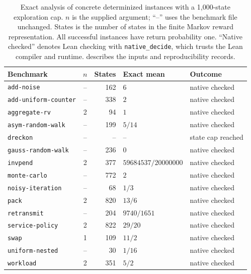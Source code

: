 \begin{table}[htbp]
    \centering
    \footnotesize
    \setlength{\tabcolsep}{3pt}
    \begin{tabular}{@{}l c r l l@{}}
        \toprule
        Benchmark & $n$ & States & Exact mean & Outcome \\
        \midrule
        \texttt{add-noise} & -- & 162 & $6$ & native checked \\
        \texttt{add-uniform-counter} & -- & 338 & $2$ & native checked \\
        \texttt{aggregate-rv} & 2 & 94 & $1$ & native checked \\
        \texttt{asym-random-walk} & -- & 199 & $5/14$ & native checked \\
        \texttt{dreckon} & -- & -- & -- & state cap reached \\
        \texttt{gauss-random-walk} & -- & 236 & $0$ & native checked \\
        \texttt{invpend} & 2 & 377 & $59684537/20000000$ & native checked \\
        \texttt{monte-carlo} & -- & 772 & $2$ & native checked \\
        \texttt{noisy-iteration} & -- & 68 & $1/3$ & native checked \\
        \texttt{pack} & 2 & 820 & $13/6$ & native checked \\
        \texttt{retransmit} & -- & 204 & $9740/1651$ & native checked \\
        \texttt{service-policy} & 2 & 822 & $29/20$ & native checked \\
        \texttt{swap} & 1 & 109 & $11/2$ & native checked \\
        \texttt{uniform-nested} & -- & 30 & $1/16$ & native checked \\
        \texttt{workload} & 2 & 351 & $5/2$ & native checked \\
        \bottomrule
    \end{tabular}
    \caption{Exact analysis of concrete determinized instances with a 1,000-state exploration cap. $n$ is the supplied argument; ``--'' uses the benchmark file unchanged. States is the number of states in the finite Markov reward representation. All successful instances have return probability one. ``Native checked'' denotes Lean checking with \texttt{native\_decide}, which trusts the Lean compiler and runtime.  describes the inputs and reproducibility records.}
    \label{tab:exact-instances}
\end{table}
